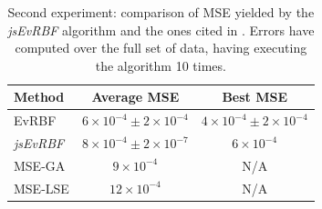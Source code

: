 \documentclass{article}
\begin{document}
\setlength{\tabcolsep}{10pt}
\begin{table}
\caption{Second experiment: comparison of MSE yielded by the {\em jsEvRBF} algorithm and the ones cited in \cite{rivas03:EvRBF}. Errors have computed over the full set of data, having executing the algorithm 10 times.}
\label{tab:comparison-second-experiment}
\begin{center}
\begin{tabular}{lcc}
{\bf Method} & {\bf Average MSE} & {\bf Best MSE} \\
\hline
EvRBF & $6 \times 10^{-4} \pm 2 \times 10^{-4}$ &$4 \times 10^{-4} \pm 2 \times 10^{-4}$ \\
{\em jsEvRBF} & $8 \times 10^{-4} \pm 2 \times 10^{-7}$ & $6\times10^{-4}$  \\
MSE-GA & $9 \times 10^{-4}$ & N/A \\
MSE-LSE &  $12 \times 10^{-4}$ & N/A \\
\hline
\end{tabular}
\end{center}
\end{table}

%
%
\end{document}
